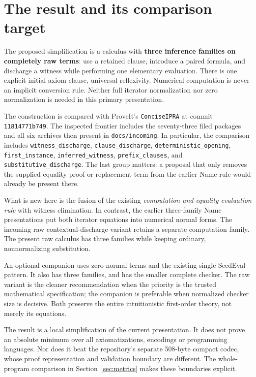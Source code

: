 \section{The result and its comparison target}
\label{sec:result}

The proposed simplification is a calculus with \textbf{three inference
families on completely raw terms}: use a retained clause, introduce a
paired formula, and discharge a witness while performing one elementary
evaluation. There is one explicit initial axiom clause, universal
reflexivity. Numerical computation is never an implicit conversion rule.
Neither full iterator normalization nor zero normalization is needed in
this primary presentation.

The construction is compared with ProveIt's \texttt{ConciseIPRA} at commit
\texttt{11814771b749}. The inspected frontier
includes the seventy-three filed packages and all six archives then present
in \texttt{docs/incoming}. In particular, the comparison includes
\texttt{witness\_discharge}, \texttt{clause\_discharge},
\texttt{deterministic\_opening}, \texttt{first\_instance},
\texttt{inferred\_witness}, \texttt{prefix\_clauses}, and
\texttt{substitutive\_discharge}. The last group matters: a proposal that
only removes the supplied equality proof or replacement term from the
earlier Name rule would already be present there.

What is new here is the fusion of the existing \emph{computation-and-equality
evaluation rule} with witness elimination. In contrast, the earlier
three-family Name presentations put both iterator equations into numerical
normal forms. The incoming raw contextual-discharge variant retains a
separate computation family. The present raw calculus has three families
while keeping ordinary, nonnormalizing substitution.

An optional companion uses zero-normal terms and the existing single
SeedEval pattern. It also has three families, and has the smaller complete
checker. The raw variant is the cleaner recommendation when the priority
is the trusted mathematical specification; the companion is preferable
when normalized checker size is decisive. Both preserve the entire
intuitionistic first-order theory, not merely its equations.

The result is a local simplification of the current presentation. It does
not prove an absolute minimum over all axiomatizations, encodings or
programming languages. Nor does it beat the repository's separate
508-byte compact codec, whose proof representation and validation boundary
are different. The whole-program comparison in Section~\ref{sec:metrics}
makes these boundaries explicit.

